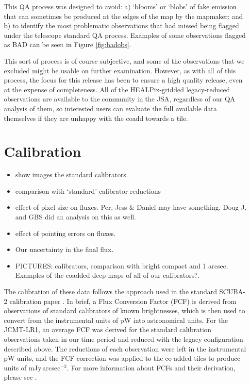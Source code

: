 \documentclass[twocolumn]{aastex6}
\begin{document}
This QA process was designed to avoid: a) `blooms' or `blobs' of fake
emission that can sometimes be produced at the edges of the map by the
mapmaker; and b) to identify the most problematic observations that
had missed being flagged under the telescope standard QA
process. Examples of some observations flagged as BAD can be seen in
Figure \ref{fig:badobs}.

This sort of process is of course subjective, and some of the
observations that we excluded might be usable on further
examination. However, as with all of this process, the focus for this
release has been to ensure a high quality release, even at the expense
of completeness. All of the HEALPix-gridded legacy-reduced
observations are available to the community in the JSA, regardless of
our QA analysis of them, so interested users can evaluate the full
available data themselves if they are unhappy with the coadd towards a
tile.


\section{Calibration}
\label{sec:calib}


\begin{itemize}
\item show images the standard calibrators.
\item comparison with `standard' calibrator reductions
\item effect of pixel size on fluxes. Per, Jess \& Daniel may have
  something. Doug J. and GBS did an analysis on this as well.
\item effect of pointing errors on fluxes.
\item Our uncertainty in the final flux.

\item PICTURES: calibrators, comparison with bright compact and 1
  arcsec. Examples of the coadded deep maps of all of our
  calibrators?.
\end{itemize}

The calibration of these data follows the approach used in the
standard SCUBA-2 calibration paper \citep{Dempsey2013}. In brief, a
Flux Conversion Factor (FCF) is derived from observations of standard
calibrators of known brightnesses, which is then used to convert from
the instrumental units of pW into astronomical units. For the
JCMT-LR1, an average FCF was derived for the standard calibration
observations taken in our time period and reduced with the legacy
configuration described above.  The reductions of each observation
were left in the instrumental pW units, and the FCF correction was
applied to the co-added tiles to produce units of
mJy\,arcsec$^{-2}$. For more information about FCFs and their
derivation, please see \citet{Dempsey2013}.
\end{document}
